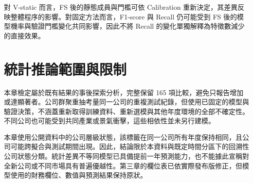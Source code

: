 對 V-static 而言，FS 後的靜態成員與門檻可依 Calibration 重新決定，其差異反映整體程序的影響。對固定方法而言，F1-score 與 Recall 仍可能受到 FS 後的模型機率與驗證門檻變化共同影響，因此不將 Recall 的變化單獨解釋為特徵數減少的直接效果。

\section{統計推論範圍與限制}

本章檢定屬於既有結果的事後探索分析，完整保留 165 項比較，避免只報告增加或達顯著者。公司群聚重抽考量同一公司的重複測試紀錄，但使用已固定的模型與驗證決策，不涵蓋重新取得訓練資料、重新選模與其他年度環境的全部不確定性。不同公司也可能受到共同產業或景氣衝擊，這些相依性並未另行建模。

本章使用公開資料中的公司層級狀態，該標籤在同一公司所有年度保持相同，且公司可能跨擬合與測試期間出現。因此，結論限於本資料與既定時間分區下的回溯性公司狀態分類。統計差異不等同模型已具備提前一年預測能力，也不能據此宣稱對全新公司或不同市場具有普遍優越性。第三章的欄位表已依實際發布版修正，但模型使用的財務欄位、數值與預測結果保持原狀。
\endgroup

